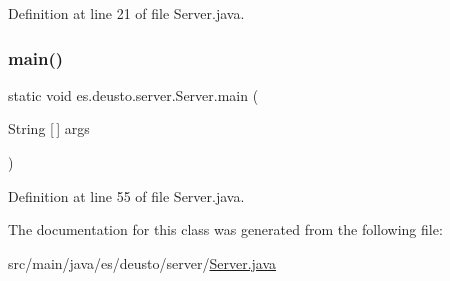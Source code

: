Definition at line 21 of file Server.\+java.

\mbox{\label{classes_1_1deusto_1_1server_1_1_server_a750bb0d7dbd89246a3602f2e20d03fb5}} 
\subsubsection{\texorpdfstring{main()}{main()}}
{\footnotesize\ttfamily static void es.\+deusto.\+server.\+Server.\+main (\begin{DoxyParamCaption}\item[{String \mbox{[}$\,$\mbox{]}}]{args }\end{DoxyParamCaption})\hspace{0.3cm}{\ttfamily [static]}}



Definition at line 55 of file Server.\+java.



The documentation for this class was generated from the following file\+:\begin{DoxyCompactItemize}
\item 
src/main/java/es/deusto/server/\hyperlink{_server_8java}{Server.\+java}\end{DoxyCompactItemize}

